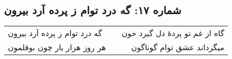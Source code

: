 \begin{center}
\section*{شماره ۱۷: گه درد توام ز پرده آرد بیرون}
\label{sec:017}
\begin{longtable}{l p{0.5cm} r}
گه درد توام ز پرده آرد بیرون
&&
گاه از غم تو پردهٔ دل گیرد خون
\\
هر روز هزار بار چون بوقلمون
&&
میگرداند عشق توام گوناگون
\\
\end{longtable}
\end{center}
